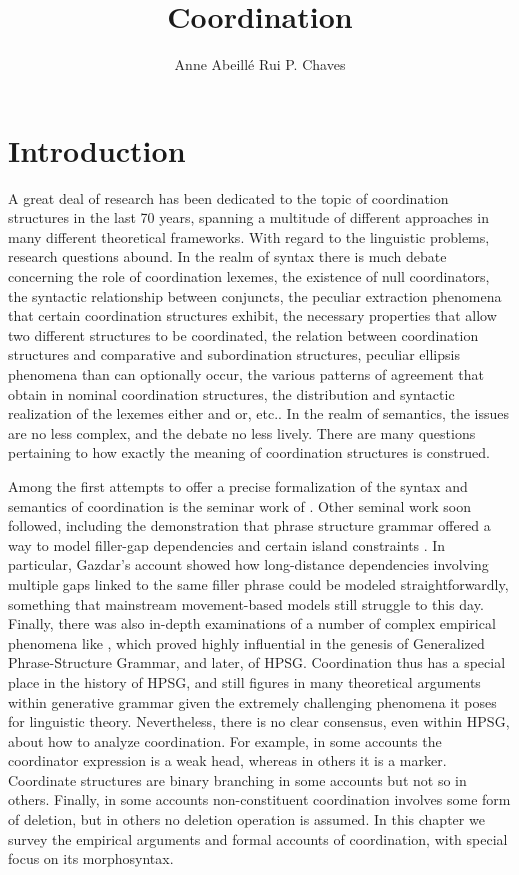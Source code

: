 \documentclass[output=paper
                ,modfonts
                ,nonflat
	        ,collection
	        ,collectionchapter
	        ,collectiontoclongg
 	        ,biblatex
                ,babelshorthands
                ,newtxmath
                ,draftmode
                ,colorlinks, citecolor=brown
]{./langsci/langscibook}
\author{Anne Abeillé\affiliation{Laboratoire de Linguistique Formelle, University of Paris} \lastand Rui P. Chaves\affiliation{Linguistics Department, University at Buffalo, The State University of New York}}
\title{Coordination}
\begin{document}
\maketitle
\label{chap-coordination}



\section{Introduction} 

A great deal of research has been dedicated to the topic of coordination structures in the last  70 years, spanning a multitude of different approaches in many different theoretical frameworks.  With regard to the linguistic problems, research questions abound. In the realm of syntax there is much debate concerning the role of coordination lexemes, the existence of null coordinators, the syntactic relationship between conjuncts, the peculiar extraction phenomena that certain coordination structures exhibit, the necessary properties that allow two different structures to be coordinated, the relation between coordination structures and comparative and subordination structures, peculiar ellipsis phenomena than can optionally occur, the various
patterns of agreement that obtain in nominal coordination structures, the distribution and syntactic realization of the lexemes either and or, etc.. In the realm of semantics, the issues are no less complex, and the debate no less lively. There are many questions pertaining to how exactly the meaning of coordination structures is construed. 

Among the first attempts to offer a precise formalization of the syntax and semantics of coordination is the seminar work of \citet{gazdarc}. Other seminal work soon followed, including the demonstration that phrase structure grammar offered a way to model filler-gap dependencies and certain island constraints \citep{gazdar}. In particular, Gazdar's account showed how long-distance dependencies involving multiple gaps linked to the same filler phrase could be modeled straightforwardly, something that mainstream movement-based models still struggle to this day. Finally, there was also 
 in-depth examinations of a number of complex empirical phenomena like  \citet{gazd1982}, which  proved highly influential in the genesis of Generalized Phrase-Structure Grammar, and later, of HPSG. Coordination thus has a special place in the history of HPSG, and still figures  in many theoretical arguments within generative grammar  given the extremely challenging phenomena it poses for linguistic theory. 
Nevertheless, there is no clear consensus, even within HPSG, about how to analyze coordination. For example, in some accounts the coordinator
expression is a weak head, whereas in others it is a marker. Coordinate structures are binary branching in some accounts but not so in others. Finally, in  some accounts non-constituent coordination involves some form of deletion, but in others no deletion operation is assumed.  
In this chapter we survey the empirical arguments and formal accounts of coordination, with special focus on its morphosyntax.
\end{document}
